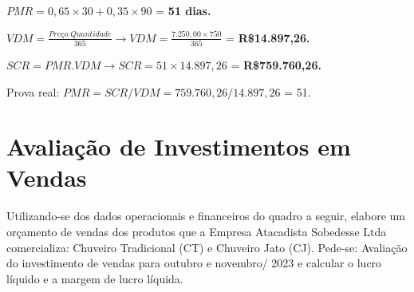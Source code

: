 \documentclass[report]{uftex}
\begin{document}
$PMR = 0,65 \times 30 + 0,35 \times 90$ = \textbf{51 dias.} 

$VDM = \frac{Preço.Quantidade}{365} \rightarrow VDM = \frac{7.250,00 \times 750}{365}$ = \textbf{R\$14.897,26.}

$SCR = PMR.VDM \rightarrow SCR = 51 \times 14.897,26$ = \textbf{R\$759.760,26.}
 
Prova real: $PMR = SCR/VDM = 759.760,26/14.897,26$ = 51.

\chapter{Avaliação de Investimentos em Vendas}

Utilizando-se dos dados operacionais e financeiros do quadro a seguir, elabore um orçamento de vendas dos produtos que a Empresa Atacadista Sobedesse Ltda comercializa: Chuveiro Tradicional (CT) e Chuveiro Jato (CJ). Pede-se: Avaliação do investimento de vendas para outubro e novembro/ 2023 e calcular o lucro líquido e a margem de lucro líquida.
\end{document}
